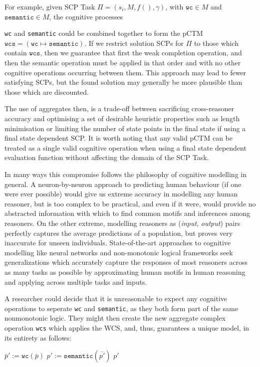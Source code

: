 For example, given SCP Task $\Pi=(s_i,M,f(),\gamma)$, with $\texttt{wc} \in M$ and $\texttt{semantic}\in M$, the cognitive processes {\texttt{wc} and \texttt{semantic} could be combined together to form the pCTM $\texttt{wcs}=(\texttt{wc} \longmapsto \texttt{semantic})$. If we restrict solution SCPs for $\Pi$ to those which contain $\texttt{wcs}$, then we guarantee that first the weak completion operation, and then the semantic operation must be applied in that order and with no other cognitive operations occurring between them. This approach may lead to fewer satisfying SCPs, but the found solution may generally be more plausible than those which are discounted.

The use of aggregates then, is a trade-off between sacrificing cross-reasoner accuracy and optimising a set of desirable heuristic properties such as length minimisation or limiting the number of state points in the final state if using a final state dependent SCP. It is worth noting that any valid pCTM can be treated as a single valid cognitive operation when using a final state dependent evaluation function without affecting the domain of the SCP Task.

In many ways this compromise follows the philosophy of cognitive modelling in general. A neuron-by-neuron approach to predicting human behaviour (if one were ever possible) would give us extreme accuracy in modelling any human reasoner, but is too complex to be practical, and even if it were, would provide no abstracted information with which to find common motifs and inferences among reasoners. On the other extreme, modelling reasoners as (\textit{input}, \textit{output}) pairs perfectly captures the average predictions of a population, but proves very inaccurate for unseen individuals. State-of-the-art approaches to cognitive modelling like neural networks and non-monotonic logical frameworks seek generalizations which accurately capture the responses of most reasoners across as many tasks as possible by approximating human motifs in human reasoning and applying across multiple tasks and inputs.

A researcher could decide that it is unreasonable to expect any cognitive operations to seperate \texttt{wc} and \texttt{semantic}, as they both form part of the same nonmonotonic logic. They might then create the new aggregate complex operation \texttt{wcs} which applies the WCS, and, thus, guarantees a unique model, in its entirety as follows:

\begin{algorithm}[H] 
\SetAlgoLined
{}
{
$\bar{p}':=\texttt{wc}(\bar{p})$\;
$p':=\texttt{semantic}(\bar{p'})$\;
\Return $p'$
}


\end{algorithm}}
